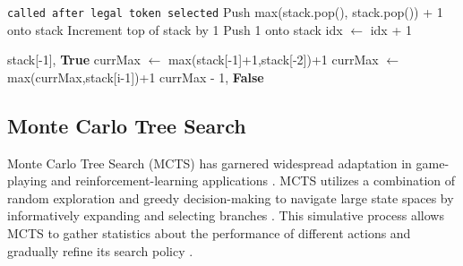 \documentclass[12pt]{iopart}
\begin{document}
\begin{algorithm}
\begin{algorithmic}[1]
        \EndIf

    \Else \Comment\texttt{{called after legal token selected}}
            \State Push max(stack.pop(), stack.pop()) + 1 onto stack 
            \State Increment top of stack by 1 
        \Else 
            \State Push 1 onto stack
         \EndIf 
         \State idx $\gets$ idx + 1

             \State \Return stack[-1], \textbf{True}
        \Else
            \State currMax $\gets$ max(stack[-1]+1,stack[-2])+1
                \State currMax $\gets$ max(currMax,stack[i-1])+1
            \EndFor
            \State \Return currMax - 1, \textbf{False}
        \EndIf

    \EndIf
\EndFunction
\end{algorithmic}
\end{algorithm}

\subsection{Monte Carlo Tree Search}\label{subsec:MonteCarlo TreeSearch}

Monte Carlo Tree Search (MCTS) has garnered widespread adaptation in game-playing and reinforcement-learning applications \cite{Silver2016} \cite{Swiechowski2023}. MCTS utilizes a combination of random exploration and greedy decision-making to navigate large state spaces by informatively expanding and selecting branches \cite{Swiechowski2023}. This simulative process allows MCTS to gather statistics about the performance of different actions and gradually refine its search policy \cite{Swiechowski2023}.
\end{document}
